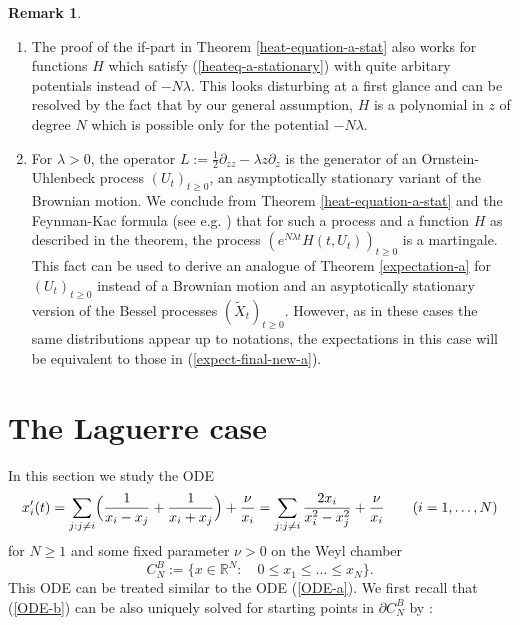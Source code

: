 \documentclass[reqno]{amsart}
\theoremstyle{plain}
\theoremstyle{definition}
\newtheorem{remark}[theorem]{Remark}
\numberwithin{equation}{section}
\begin{document}
\begin{remark}\label{martingale-a-stat}
\begin{enumerate}
\item[\rm{(1)}]  The proof of the if-part in Theorem \ref{heat-equation-a-stat}
  also works for functions $H$ which satisfy (\ref{heateq-a-stationary}) with quite arbitary potentials instead of
  $  -N\lambda$. This looks disturbing at a first glance and can be resolved  by the fact that by our general
  assumption, $H$ is a polynomial in $z$ of degree $N$ which is possible only for the potential $ -N\lambda$.
\item[\rm{(2)}]  For $\lambda>0$, the operator $L:=\frac{1}{2}\partial_{zz} -\lambda z \partial_{z}$
  is the generator of an Ornstein-Uhlenbeck process $(U_t)_{t\ge0}$, an asymptotically stationary variant of the
  Brownian motion. We conclude from Theorem \ref{heat-equation-a-stat} and
  the Feynman-Kac formula (see e.g. \cite{RW}) that for such a process and a function $H$ as described in the theorem,
  the process
  $(e^{N\lambda t} H(t, U_t))_{t\ge0}$ is a martingale. This fact can be used to derive an analogue of Theorem \ref{expectation-a} for 
 $(U_t)_{t\ge0}$ instead of a Brownian motion and an asyptotically stationary version of the Bessel processes $(\tilde X_t)_{t\ge0}$.
  However, as in these cases the same distributions appear up to  notations, the expectations in this case will be equivalent to those in
  (\ref{expect-final-new-a}).
\end{enumerate} 
\end{remark}


 \section{The Laguerre case}

 

In this section we study the ODE
\begin{equation}\label{ODE-b}
  x_i^\prime(t)= \sum_{j: j\ne i}\Bigl( \frac{1}{x_i-x_j}+  
 \frac{1}{x_i+x_j}\Bigr)+\frac{\nu}{x_i} = \sum_{j: j\ne i}\frac{2x_i}{x_i^2-x_j^2}+\frac{\nu}{x_i}
 \quad\quad (i=1,\ldots,N)
\end{equation}
for $N\ge1$ and some fixed parameter $\nu>0$ on  the Weyl chamber
$$C_N^B:=\{x\in\mathbb R^N: \quad 0\le x_1\le \ldots\le x_N\}.$$
This ODE can be treated similar  to the ODE  (\ref{ODE-a}).
We first recall that (\ref{ODE-b}) can be also uniquely solved for starting points in  $\partial C_N^B$
by \cite{VW3}:
\end{document}
